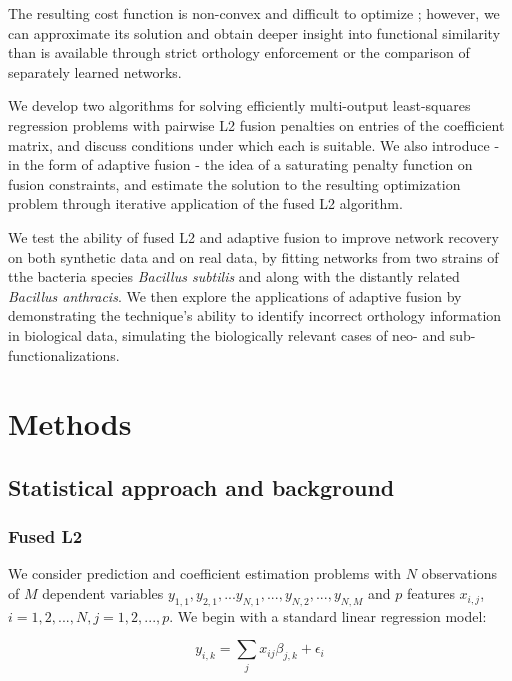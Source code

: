 \documentclass[11pt]{article}
\begin{document}
The resulting cost function is non-convex and difficult to optimize \cite{fan2001variable}; however, we can approximate its solution and obtain deeper insight into functional similarity than is available through strict orthology enforcement or the comparison of separately learned networks. 

We develop two algorithms for solving efficiently multi-output least-squares regression problems with pairwise L2 fusion penalties on entries of the coefficient matrix, and discuss conditions under which each is suitable. We also introduce - in the form of adaptive fusion - the idea of a saturating penalty function on fusion constraints, and estimate the solution to the resulting optimization problem through iterative application of the fused L2 algorithm.

We test the ability of fused L2 and adaptive fusion to improve network recovery on both synthetic data and on real data, by fitting  networks from two strains of tthe bacteria species \textit{Bacillus subtilis} and along with the distantly related \textit{Bacillus anthracis}. We then explore the applications of adaptive fusion by demonstrating the technique's ability to identify incorrect orthology information in biological data, simulating the biologically relevant cases of neo- and sub-functionalizations. 


\section{Methods}

\subsection{Statistical approach and background}
\subsubsection{Fused L2}
We consider prediction and coefficient estimation problems with $N$ observations of $M$ dependent variables $y_{1,1}, y_{2,1}, ...y_{N,1},..., y_{N,2},..., y_{N, M}$ and $p$ features $x_{i,j}$, $i=1,2,...,N, j=1,2,...,p$. We begin with a standard linear regression model:

\begin{equation}
y_{i,k} = \displaystyle\sum_{j}x_{ij}\beta_{j,k} + \epsilon_i
\end{equation}
\end{document}
